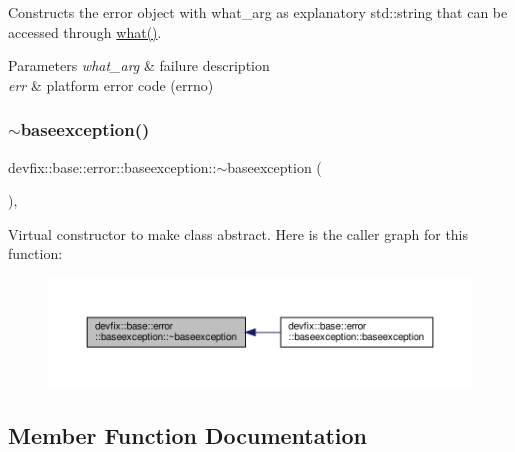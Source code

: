 Constructs the error object with what\+\_\+arg as explanatory std\+::string that can be accessed through \hyperlink{structdevfix_1_1base_1_1error_1_1baseexception_a16327152a55d65b1e537825231fbd452}{what()}. 
\begin{DoxyParams}{Parameters}
{\em what\+\_\+arg} & failure description \\
\hline
{\em err} & platform error code (errno) \\
\hline
\end{DoxyParams}
\mbox{\label{structdevfix_1_1base_1_1error_1_1baseexception_a3ae67c736d3268683cb92556c9f14bd7}} 
\subsubsection{\texorpdfstring{$\sim$baseexception()}{~baseexception()}}
{\footnotesize\ttfamily devfix\+::base\+::error\+::baseexception\+::$\sim$baseexception (\begin{DoxyParamCaption}{ }\end{DoxyParamCaption})\hspace{0.3cm}{\ttfamily [override]}, {\ttfamily [default]}}

Virtual constructor to make class abstract. Here is the caller graph for this function\+:\nopagebreak
\begin{figure}[H]
\begin{center}
\leavevmode
\includegraphics[width=350pt]{structdevfix_1_1base_1_1error_1_1baseexception_a3ae67c736d3268683cb92556c9f14bd7_icgraph}
\end{center}
\end{figure}


\subsection{Member Function Documentation}
\mbox{\label{structdevfix_1_1base_1_1error_1_1baseexception_ae2333e7e833e2b922fb8aa50c7fa8e79}} 
